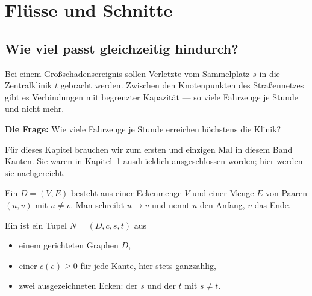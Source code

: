 \chapter{Flüsse und Schnitte}

\section{Wie viel passt gleichzeitig hindurch?}

\begin{merksatz}
Bei einem Großschadensereignis sollen Verletzte vom Sammelplatz $s$ in die Zentralklinik $t$ gebracht werden. Zwischen den Knotenpunkten des Straßennetzes gibt es Verbindungen mit begrenzter Kapazität --- so viele Fahrzeuge je Stunde und nicht mehr.

\textbf{Die Frage:} Wie viele Fahrzeuge je Stunde erreichen höchstens die Klinik?

\begin{center}
\begin{minipage}{0.88\textwidth}
\end{minipage}
\end{center}
\end{merksatz}

Für dieses Kapitel brauchen wir zum ersten und einzigen Mal in diesem Band  Kanten. Sie waren in Kapitel~1 ausdrücklich ausgeschlossen worden; hier werden sie nachgereicht.

\begin{definition}
Ein  $D = (V, E)$ besteht aus einer Eckenmenge $V$ und einer Menge $E$ von  Paaren $(u,v)$ mit $u \neq v$. Man schreibt $u \to v$ und nennt $u$ den Anfang, $v$ das Ende.

Ein  ist ein Tupel $N = (D, c, s, t)$ aus
\begin{itemize}[leftmargin=1.4em, itemsep=3pt]
\item einem gerichteten Graphen $D$,
\item einer  $c(e) \ge 0$ für jede Kante, hier stets ganzzahlig,
\item zwei ausgezeichneten Ecken: der  $s$ und der  $t$ mit $s \neq t$.
\end{itemize}
\end{definition}

